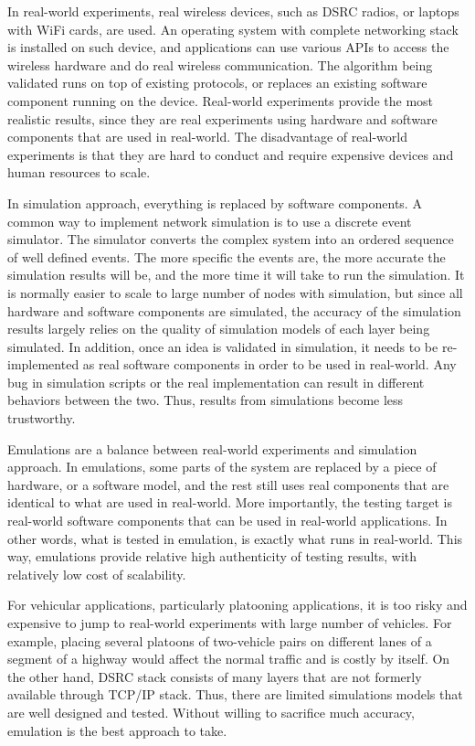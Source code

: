 \documentclass[12pt]{report}
\begin{document}
In real-world experiments, real wireless devices, such as DSRC radios, or laptops with WiFi cards, are used. An operating system with complete networking stack is installed on such device, and applications can use various APIs to access the wireless hardware and do real wireless communication. The algorithm being validated runs on top of existing protocols, or replaces an existing software component running on the device. Real-world experiments provide the most realistic results, since they are real experiments using hardware and software components that are used in real-world. The disadvantage of real-world experiments is that they are hard to conduct and require expensive devices and human resources to scale.

In simulation approach, everything is replaced by software components. A common way to implement network simulation is to use a discrete event simulator. The simulator converts the complex system into an ordered sequence of well defined events. The more specific the events are, the more accurate the simulation results will be, and the more time it will take to run the simulation. It is normally easier to scale to large number of nodes with simulation, but since all hardware and software components are simulated, the accuracy of the simulation results largely relies on the quality of simulation models of each layer being simulated. In addition, once an idea is validated in simulation, it needs to be re-implemented as real software components in order to be used in real-world. Any bug in simulation scripts or the real implementation can result in different behaviors between the two. Thus, results from simulations become less trustworthy.

Emulations are a balance between real-world experiments and simulation approach. In emulations, some parts of the system are replaced by a piece of hardware, or a software model, and the rest still uses real components that are identical to what are used in real-world. More importantly, the testing target is real-world software components that can be used in real-world applications. In other words, what is tested in emulation, is exactly what runs in real-world. This way, emulations provide relative high authenticity of testing results, with relatively low cost of scalability.

For vehicular applications, particularly platooning applications, it is too risky and expensive to jump to real-world experiments with large number of vehicles. For example, placing several platoons of two-vehicle pairs on different lanes of a segment of a highway would affect the normal traffic and is costly by itself. On the other hand, DSRC stack consists of many layers that are not formerly available through TCP/IP stack. Thus, there are limited simulations models that are well designed and tested. Without willing to sacrifice much accuracy, emulation is the best approach to take.
\end{document}
